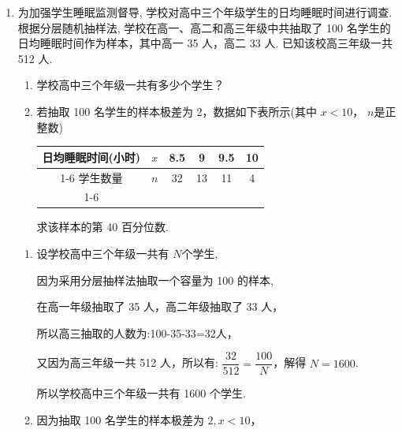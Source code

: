 \begin{enumerate}
\begin{jieda}
\begin{enumerate}
            又因为 ${5a} \times  {100} = 2$，所以 $a = {0.004}$，
            
            因为 ${5b} \times  {100} = {13}$,所以 $b = {0.026}$,
            
            所以 $c = {0.07}$,
            
            所以 $\dfrac{b}{c} = \dfrac{13}{35},a = {0.004}$.
        \end{enumerate}
    \end{jieda}
    \item 为加强学生睡眠监测督导, 学校对高中三个年级学生的日均睡眠时间进行调查.根据分层随机抽样法, 学校在高一、高二和高三年级中共抽取了 100 名学生的日均睡眠时间作为样本，其中高一 35 人，高二 33 人. 已知该校高三年级一共 512 人.
    \begin{enumerate}
        \item 学校高中三个年级一共有多少个学生？
        \item 若抽取 100 名学生的样本极差为 2，数据如下表所示(其中 $x < {10}$， $n$是正整数)
        
        \begin{center}
        \begin{tabular}{|c|c|c|c|c|c|}
        \hline
        日均睡眠时间(小时) & $x$& 8.5 & 9 & 9.5 & 10 \\
        \cline{1-6}
        学生数量 & $n$& 32 & 13 & 11 & 4 \\
        \cline{1-6}
        \hline
        \end{tabular}
        \end{center}
        
        求该样本的第 40 百分位数.
    \end{enumerate}
    
    \begin{jieda}
        \begin{enumerate}
            \item 设学校高中三个年级一共有 $N$个学生,
            
            因为采用分层抽样法抽取一个容量为 100 的样本,
            
            在高一年级抽取了 35 人，高二年级抽取了 33 人，
            
            所以高三抽取的人数为:100-35-33=32人，
            
            又因为高三年级一共 512 人，所以有: $\dfrac{32}{512} = \dfrac{100}{N}$，解得 $N = {1600}$.
            
            所以学校高中三个年级一共有 1600 个学生.
            \item 因为抽取 100 名学生的样本极差为 $2,x < {10}$，
            

\end{enumerate}
\end{jieda}
\end{enumerate}
